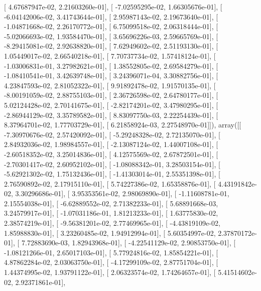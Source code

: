 \documentclass{article}
\begin{document}
       [  4.67687947e-02,   2.21603260e-01],
       [ -7.02595295e-02,   1.66305676e-01],
       [ -6.04142006e-02,   3.41743644e-01],
       [  2.95987143e-02,   2.19673640e-01],
       [ -1.04871668e-02,   2.26170772e-01],
       [  6.75099518e-02,   2.06318444e-01],
       [ -5.02066693e-02,   1.93584470e-01],
       [  3.65696226e-03,   2.59665769e-01],
       [ -8.29415081e-02,   2.92638820e-01],
       [  7.62949602e-02,   2.51193130e-01],
       [  1.05449017e-02,   2.66540218e-01],
       [  7.70737734e-02,   1.57418124e-01],
       [ -1.03006831e-01,   3.27982621e-01],
       [  1.38552805e-02,   2.69584279e-01],
       [ -1.08410541e-01,   3.42639748e-01],
       [  3.24396071e-04,   3.30882756e-01],
       [  4.23847593e-02,   2.81052322e-01],
       [  9.91892478e-02,   1.91570135e-01],
       [ -8.00191059e-02,   2.88755103e-01],
       [  2.36726598e-02,   2.64780177e-01],
       [  5.02124428e-02,   2.70141675e-01],
       [ -2.82174201e-02,   3.47980295e-01],
       [ -2.86944129e-02,   3.35789582e-01],
       [  8.83097750e-03,   2.22254439e-01],
       [  8.37964701e-02,   1.77703729e-01],
       [  6.21858924e-03,   2.27548970e-01]]), array([[ -7.30970676e-02,   2.57420092e-01],
       [ -5.29248328e-02,   2.72135070e-01],
       [  2.84932036e-02,   1.98984557e-01],
       [ -2.13087124e-02,   1.44007108e-01],
       [ -2.60518352e-02,   3.25014836e-01],
       [  4.12575569e-02,   2.67872501e-01],
       [ -2.70301417e-02,   2.60952102e-01],
       [ -1.08088342e-01,   3.28503154e-01],
       [ -5.62921302e-02,   1.75132436e-01],
       [ -1.41303014e-01,   2.55351398e-01],
       [  2.76590892e-02,   2.17915110e-01],
       [  5.74227386e-02,   1.65358876e-01],
       [  4.43191842e-02,   3.30296686e-01],
       [  3.95353561e-02,   2.98069890e-01],
       [ -1.11608781e-01,   2.15554038e-01],
       [ -6.62889552e-02,   2.71382233e-01],
       [  5.68891668e-03,   3.24579917e-01],
       [ -1.07031186e-01,   1.81213233e-01],
       [  1.63775830e-02,   2.38574219e-01],
       [ -9.56381201e-02,   2.77469965e-01],
       [ -4.43819109e-02,   1.85988830e-01],
       [  3.23260485e-02,   1.94912994e-01],
       [  5.60354997e-02,   2.37870172e-01],
       [  7.72883690e-03,   1.82943968e-01],
       [ -4.22541129e-02,   2.90853750e-01],
       [ -1.08121266e-01,   2.65017103e-01],
       [  5.77924816e-02,   1.85854221e-01],
       [  4.87862284e-02,   2.03063750e-01],
       [ -4.17299109e-02,   2.87751704e-01],
       [  1.44374995e-02,   1.93791122e-01],
       [  2.06323574e-02,   1.74264657e-01],
       [  5.41514602e-02,   2.92371861e-01],
\end{document}
